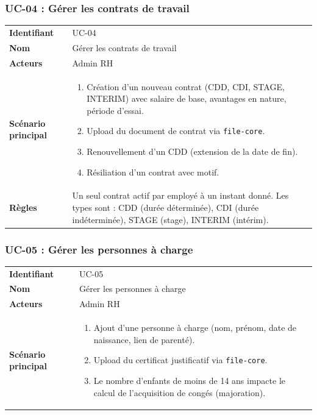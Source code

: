 \documentclass[a4paper,12pt,openany]{book}
\begin{document}
    \subsubsection*{UC-04 : Gérer les contrats de travail}
    \begin{table}[H]
        \centering
        \begin{tabularx}{\textwidth}{lX}
    \toprule
    \textbf{Identifiant} & UC-04 \\
    \textbf{Nom}         & Gérer les contrats de travail \\
    \textbf{Acteurs}     & Admin RH \\
    \midrule
    \textbf{Scénario principal} &
    \begin{enumerate}[nosep]
      \item Création d'un nouveau contrat (CDD, CDI, STAGE, INTERIM) avec salaire de base, avantages en nature, période d'essai.
      \item Upload du document de contrat via \texttt{file-core}.
      \item Renouvellement d'un CDD (extension de la date de fin).
      \item Résiliation d'un contrat avec motif.
    \end{enumerate} \\
    \textbf{Règles} & Un seul contrat actif par employé à un instant donné. Les types sont : CDD (durée déterminée), CDI (durée indéterminée), STAGE (stage), INTERIM (intérim). \\
    \bottomrule
        \end{tabularx}
    \end{table}

    \subsubsection*{UC-05 : Gérer les personnes à charge}
    \begin{table}[H]
        \centering
        \begin{tabularx}{\textwidth}{lX}
    \toprule
    \textbf{Identifiant} & UC-05 \\
    \textbf{Nom}         & Gérer les personnes à charge \\
    \textbf{Acteurs}     & Admin RH \\
    \midrule
    \textbf{Scénario principal} &
    \begin{enumerate}[nosep]
      \item Ajout d'une personne à charge (nom, prénom, date de naissance, lien de parenté).
      \item Upload du certificat justificatif via \texttt{file-core}.
      \item Le nombre d'enfants de moins de 14 ans impacte le calcul de l'acquisition de congés (majoration).
    \end{enumerate} \\
    \bottomrule
        \end{tabularx}
    \end{table}
\end{document}
